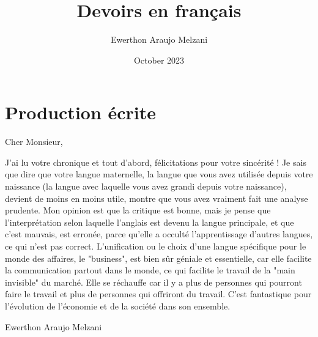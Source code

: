 \documentclass{article}
\title{Devoirs en français}
\author{Ewerthon Araujo Melzani}
\date{October 2023}
\begin{document}
\maketitle

\section*{Production écrite}

Cher Monsieur,

J'ai lu votre chronique et tout d'abord, félicitations pour votre sincérité ! Je sais que dire que votre langue maternelle, la langue que vous avez utilisée depuis votre naissance (la langue avec laquelle vous avez grandi depuis votre naissance), devient de moins en moins utile, montre que vous avez vraiment fait une analyse prudente. Mon opinion est que la critique est bonne, mais je pense que l'interprétation selon laquelle l'anglais est devenu la langue principale, et que c'est mauvais, est erronée, parce qu'elle a occulté l'apprentissage d'autres langues, ce qui n'est pas correct. L'unification ou le choix d'une langue spécifique pour le monde des affaires, le "business", est bien sûr géniale et essentielle, car elle facilite la communication partout dans le monde, ce qui facilite le travail de la "main invisible" du marché. Elle se réchauffe car il y a plus de personnes qui pourront faire le travail et plus de personnes qui offriront du travail. C'est fantastique pour l'évolution de l'économie et de la société dans son ensemble.


Ewerthon Araujo Melzani
\end{document}
